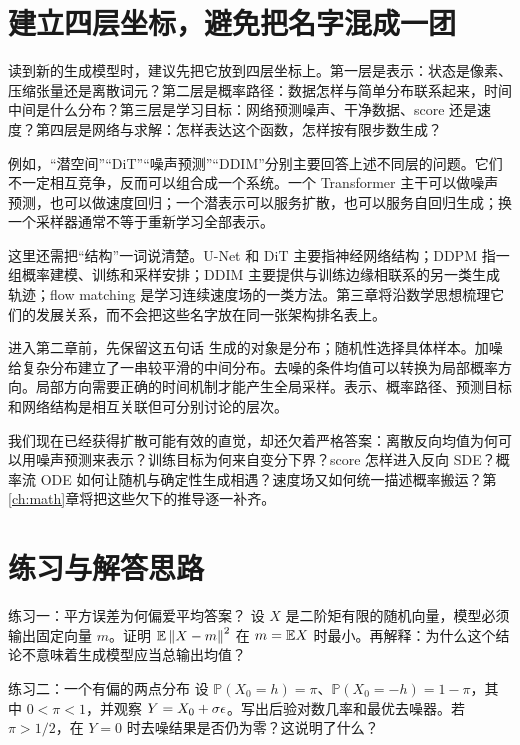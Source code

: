 \section{建立四层坐标，避免把名字混成一团}
\label{sec:c-four-layers}

读到新的生成模型时，建议先把它放到四层坐标上。第一层是表示：状态是像素、压缩张量还是离散词元？第二层是概率路径：数据怎样与简单分布联系起来，时间中间是什么分布？第三层是学习目标：网络预测噪声、干净数据、score 还是速度？第四层是网络与求解：怎样表达这个函数，怎样按有限步数生成？

例如，“潜空间”“DiT”“噪声预测”“DDIM”分别主要回答上述不同层的问题。它们不一定相互竞争，反而可以组合成一个系统。一个 Transformer 主干可以做噪声预测，也可以做速度回归；一个潜表示可以服务扩散，也可以服务自回归生成；换一个采样器通常不等于重新学习全部表示。

这里还需把“结构”一词说清楚。U-Net 和 DiT 主要指神经网络结构；DDPM 指一组概率建模、训练和采样安排；DDIM 主要提供与训练边缘相联系的另一类生成轨迹；flow matching 是学习连续速度场的一类方法。第三章将沿数学思想梳理它们的发展关系，而不会把这些名字放在同一张架构排名表上。

\begin{keybox}{进入第二章前，先保留这五句话}
生成的对象是分布；随机性选择具体样本。加噪给复杂分布建立了一串较平滑的中间分布。去噪的条件均值可以转换为局部概率方向。局部方向需要正确的时间机制才能产生全局采样。表示、概率路径、预测目标和网络结构是相互关联但可分别讨论的层次。
\end{keybox}

我们现在已经获得扩散可能有效的直觉，却还欠着严格答案：离散反向均值为何可以用噪声预测来表示？训练目标为何来自变分下界？score 怎样进入反向 SDE？概率流 ODE 如何让随机与确定性生成相遇？速度场又如何统一描述概率搬运？第\ref{ch:math}章将把这些欠下的推导逐一补齐。

\section{练习与解答思路}
\label{sec:c-exercises}

\begin{exercisebox}{练习一：平方误差为何偏爱平均答案？}
设 $X$ 是二阶矩有限的随机向量，模型必须输出固定向量 $m$。证明 $\mathbb{E}\left\lVert X-m\right\rVert^2$ 在 $m=\mathbb{E} X$ 时最小。再解释：为什么这个结论不意味着生成模型应当总输出均值？
\end{exercisebox}

\begin{exercisebox}{练习二：一个有偏的两点分布}
设 $\mathbb P(X_0=h)=\pi$、$\mathbb P(X_0=-h)=1-\pi$，其中 $0<\pi<1$，并观察 $Y=X_0+\sigma\epsilon$。写出后验对数几率和最优去噪器。若 $\pi>1/2$，在 $Y=0$ 时去噪结果是否仍为零？这说明了什么？
\end{exercisebox}

